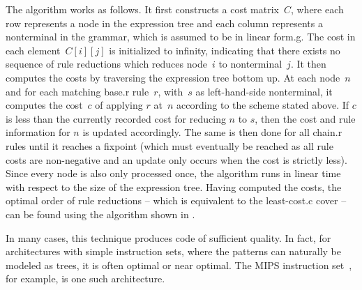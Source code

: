 The algorithm works as follows.
%
It first constructs a cost matrix~$C$, where each row represents a node in the
\gls{expression tree} and each column represents a \gls{nonterminal} in the
\gls{grammar}, which is assumed to be in \gls{linear form.g}.
%
The cost in each element~\mbox{$C[i][j]$} is initialized to infinity,
indicating that there exists no sequence of \glspl{rule reduction} which reduces
node~$i$ to \gls{nonterminal}~$j$.
%
It then computes the costs by traversing the \gls{expression tree} bottom up.
%
At each node~$n$ and for each matching \gls{base.r} \gls{rule}~$r$, with~$s$ as
left-hand-side \gls{nonterminal}, it computes the cost~$c$ of applying $r$
at~$n$ according to the scheme stated above.
%
If $c$ is less than the currently recorded cost for reducing $n$ to $s$, then
the cost and \gls{rule} information for $n$ is updated accordingly.
%
The same is then done for all \gls{chain.r} \glspl{rule} until it reaches a
fixpoint (which must eventually be reached as all \gls{rule} costs are
non-negative and an update only occurs when the cost is strictly less).
%
Since every node is also only processed once, the algorithm runs in linear time
with respect to the size of the \gls{expression tree}.
%
Having computed the costs, the optimal order of \glspl{rule reduction} -- which
is equivalent to the \gls{least-cost.c} \gls{cover} -- can be found using the
algorithm shown in .

\begin{algorithm}[t]

  \caption{%
            Algorithm for selecting rules based on costs computed by
          }
\end{algorithm}

In many cases, this technique produces code of sufficient quality.
%
In fact, for architectures with simple \glspl{instruction set}, where the
\glspl{pattern} can naturally be modeled as trees, it is often optimal or near
optimal.
%
The MIPS \gls{instruction set}~\cite{Sweetman:2006}, for example, is one such
architecture.



